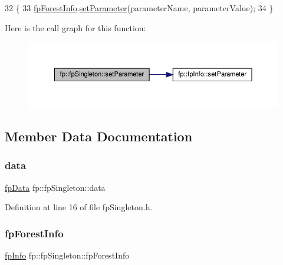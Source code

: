 \begin{DoxyCode}
32                                                                                               \{
33                 \hyperlink{classfp_1_1fpSingleton_a85965009befa72a749ae498fa5b6ccfa}{fpForestInfo}.\hyperlink{classfp_1_1fpInfo_ae4c749c466e983cb312cc08d38b2796e}{setParameter}(parameterName, parameterValue);
34             \}
\end{DoxyCode}
Here is the call graph for this function\+:\nopagebreak
\begin{figure}[H]
\begin{center}
\leavevmode
\includegraphics[width=350pt]{classfp_1_1fpSingleton_a3465c3ff9376fae2933d9267c32761ca_cgraph}
\end{center}
\end{figure}


\subsection{Member Data Documentation}
\mbox{\label{classfp_1_1fpSingleton_a2fa16ac6a0f66641749032eeee61b8e9}} 
\subsubsection{\texorpdfstring{data}{data}}
{\footnotesize\ttfamily \hyperlink{classfp_1_1fpData}{fp\+Data} fp\+::fp\+Singleton\+::data\hspace{0.3cm}{\ttfamily [private]}}



Definition at line 16 of file fp\+Singleton.\+h.

\mbox{\label{classfp_1_1fpSingleton_a85965009befa72a749ae498fa5b6ccfa}} 
\subsubsection{\texorpdfstring{fp\+Forest\+Info}{fpForestInfo}}
{\footnotesize\ttfamily \hyperlink{classfp_1_1fpInfo}{fp\+Info} fp\+::fp\+Singleton\+::fp\+Forest\+Info\hspace{0.3cm}{\ttfamily [private]}}



